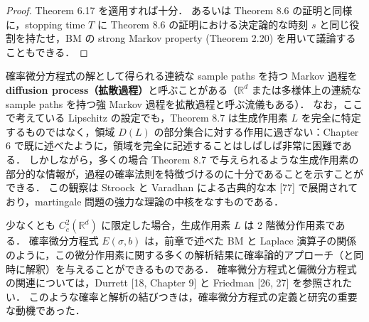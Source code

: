 \documentclass{jsarticle}
\begin{document}
\begin{proof}
    Theorem 6.17 を適用すれば十分．
    あるいは Theorem 8.6 の証明と同様に，stopping time $T$ に Theorem 8.6 の証明における決定論的な時刻 $s$ と同じ役割を持たせ，BM の strong Markov property (Theorem 2.20) を用いて議論することもできる．
\end{proof}

確率微分方程式の解として得られる連続な sample paths を持つ Markov 過程を \textbf{diffusion process（拡散過程）}と呼ぶことがある（$\mathbb{R}^d$ または多様体上の連続な sample paths を持つ強 Markov 過程を拡散過程と呼ぶ流儀もある）．
なお，ここで考えている Lipschitz の設定でも，Theorem 8.7 は生成作用素 $L$ を完全に特定するものではなく，領域 $D(L)$ の部分集合に対する作用に過ぎない：Chapter 6 で既に述べたように，領域を完全に記述することはしばしば非常に困難である．
しかしながら，多くの場合 Theorem 8.7 で与えられるような生成作用素の部分的な情報が，過程の確率法則を特徴づけるのに十分であることを示すことができる．
この観察は Stroock と Varadhan による古典的な本 [77] で展開されており，martingale 問題の強力な理論の中核をなすものである．

少なくとも $C_{c}^2(\mathbb{R}^d)$ に限定した場合，生成作用素 $L$ は 2 階微分作用素である．
確率微分方程式 $E(\sigma, b)$ は，前章で述べた BM と Laplace 演算子の関係のように，この微分作用素に関する多くの解析結果に確率論的アプローチ（と同時に解釈）を与えることができるものである．
確率微分方程式と偏微分方程式の関連については，Durrett [18, Chapter 9] と Friedman [26, 27] を参照されたい．
このような確率と解析の結びつきは，確率微分方程式の定義と研究の重要な動機であった．
\end{document}
